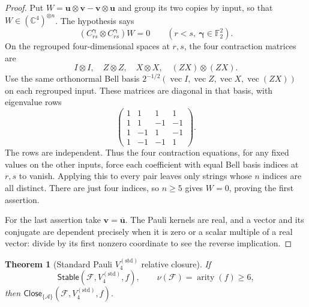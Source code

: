 \documentclass[11pt,letterpaper,onecolumn]{article}
\theoremstyle{plain}
\newtheorem{theorem}{Theorem}[section]
\theoremstyle{definition}
\theoremstyle{remark}
\newcommand{\Ftwo}{\mathbb F_2}
\newcommand{\cF}{\mathcal F}
\newcommand{\cA}{\mathscr A}
\newcommand{\KleinStd}{{V_4^{(\mathrm{std})}}}
\newcommand{\Stable}{\mathsf{Stable}}
\newcommand{\Close}{\mathsf{Close}}
\newcommand{\arity}{\operatorname{arity}}
\begin{document}
\begin{proof}
Put \(W={\mathbf{u}}\otimes {\mathbf{v}}-{\mathbf{v}}\otimes {\mathbf{u}}\) and group its two copies by input, so that \(W\in(\mathbb C^4)^{\otimes n}\).  The hypothesis says
\[
 (C_{rs}^{\boldsymbol{\gamma}}\otimes C_{rs}^{\boldsymbol{\gamma}})W=0
 \qquad(r<s,\ {\boldsymbol{\gamma}}\in\Ftwo^2).
\]
On the regrouped four-dimensional spaces at \(r,s\), the four
contraction matrices are
\[
 I\otimes I,\quad Z\otimes Z,\quad X\otimes X,
 \quad (ZX)\otimes(ZX).
\]
Use the same orthonormal Bell basis
\(2^{-1/2}(\operatorname{vec}I,\operatorname{vec}Z,
\operatorname{vec}X,\operatorname{vec}(ZX))\) on each regrouped input.
These matrices are diagonal in that basis, with eigenvalue rows
\[
 \begin{pmatrix}
  1&1&1&1\\
  1&1&-1&-1\\
  1&-1&1&-1\\
  1&-1&-1&1
 \end{pmatrix}.
\]
The rows are independent.  Thus the four contraction equations, for any
fixed values on the other inputs, force each coefficient with equal Bell
basis indices at \(r,s\) to vanish.  Applying this to every pair leaves
only strings whose \(n\) indices are all distinct.  There are just four
indices, so \(n\ge5\) gives \(W=0\), proving the first assertion.

For the last assertion take \({\mathbf{v}}=\overline {\mathbf{u}}\).  The Pauli kernels are
real, and a vector and its conjugate are dependent precisely when it is
zero or a scalar multiple of a real vector: divide by its first nonzero
coordinate to see the reverse implication.
\end{proof}

\begin{theorem}[Standard Pauli \(\KleinStd\) relative closure]
\label{thm:standard-v4-relative}
If
\[
 \Stable(\cF,\KleinStd,f),\qquad \nu(\cF)=\arity(f)\ge6,
\]
then \(\Close_{\{\cA\}}(\cF,\KleinStd,f)\).
\end{theorem}
\end{document}
